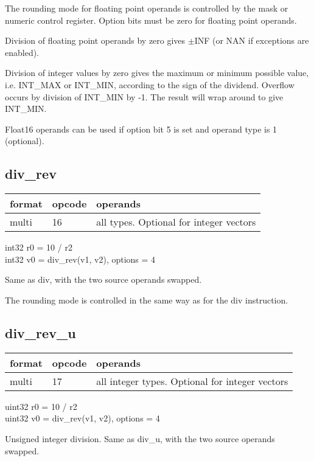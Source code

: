 \documentclass[forwardcom.tex]{subfiles}
\begin{document}
\vv
The rounding mode for floating point operands is controlled by the mask or numeric control register. Option bits must be zero for floating point operands.

\vv
Division of floating point operands by zero gives $\pm$INF (or NAN if exceptions are enabled).
\vv

Division of integer values by zero gives the maximum or minimum possible value, i.e. INT\_MAX or INT\_MIN, according to the sign of the dividend. 
Overflow occurs by division of INT\_MIN by -1. The result will wrap around to give INT\_MIN.
\vv

Float16 operands can be used if option bit 5 is set and operand type is 1 (optional).
\vv


\subsection{div\_rev}
\label{table:divRevInstruction}
\begin{tabular}{|p{12mm}|p{15mm}|p{100mm}|}
\hline
\bfseries format & \bfseries opcode & \bfseries operands \\ \hline
multi & 16 & all types. Optional for integer vectors \\ \hline
\end{tabular}
\vv

int32 r0 = 10 / r2 \\
int32 v0 = div\_rev(v1, v2), options = 4
\vv

Same as div, with the two source operands swapped.

The rounding mode is controlled in the same way as for the div instruction.
\vv

\subsection{div\_rev\_u}
\label{table:divRevUInstruction}
\begin{tabular}{|p{12mm}|p{15mm}|p{100mm}|}
\hline
\bfseries format & \bfseries opcode & \bfseries operands \\ \hline
multi & 17 & all integer types. Optional for integer vectors \\ \hline
\end{tabular}
\vv

uint32 r0 = 10 / r2 \\
uint32 v0 = div\_rev(v1, v2), options = 4
\vv

Unsigned integer division. Same as div\_u, with the two source operands swapped.
\end{document}
